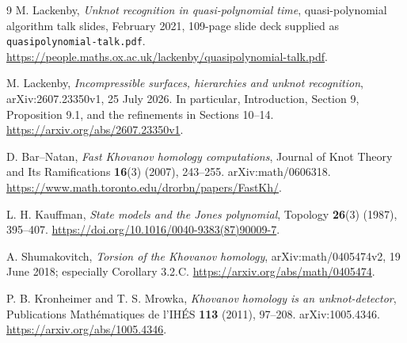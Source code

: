 \documentclass[11pt]{article}
\theoremstyle{remark}\newtheorem{remark}[theorem]{Remark}
\begin{document}
\begin{thebibliography}{9}
M. Lackenby, \emph{Unknot recognition in quasi-polynomial time},
quasi-polynomial algorithm talk slides, February 2021,
109-page slide deck supplied as \texttt{quasipolynomial-talk.pdf}.
\url{https://people.maths.ox.ac.uk/lackenby/quasipolynomial-talk.pdf}.

M. Lackenby, \emph{Incompressible surfaces, hierarchies and unknot recognition},
arXiv:2607.23350v1, 25 July 2026. In particular, Introduction,
Section 9, Proposition 9.1, and the refinements in Sections 10--14.
\url{https://arxiv.org/abs/2607.23350v1}.

D. Bar--Natan, \emph{Fast Khovanov homology computations},
Journal of Knot Theory and Its Ramifications \textbf{16}(3) (2007),
243--255. arXiv:math/0606318.
\url{https://www.math.toronto.edu/drorbn/papers/FastKh/}.

L. H. Kauffman, \emph{State models and the Jones polynomial},
Topology \textbf{26}(3) (1987), 395--407.
\url{https://doi.org/10.1016/0040-9383(87)90009-7}.

A. Shumakovitch, \emph{Torsion of the Khovanov homology},
arXiv:math/0405474v2, 19 June 2018; especially Corollary 3.2.C.
\url{https://arxiv.org/abs/math/0405474}.

P. B. Kronheimer and T. S. Mrowka,
\emph{Khovanov homology is an unknot-detector},
Publications Math\'ematiques de l'IH\'ES \textbf{113} (2011), 97--208.
arXiv:1005.4346.
\url{https://arxiv.org/abs/1005.4346}.
\end{thebibliography}
\end{document}
